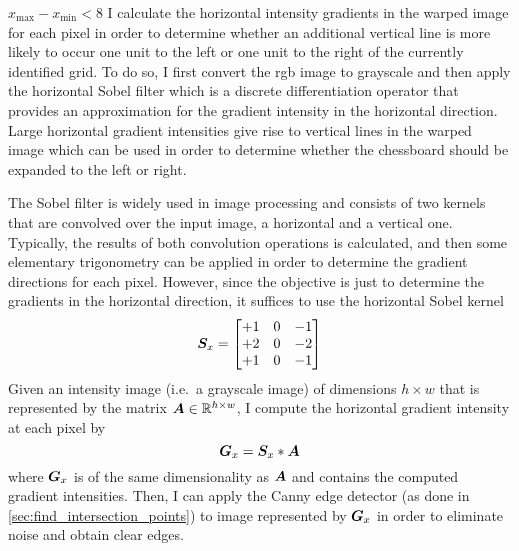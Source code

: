 \documentclass[../report.tex]{subfiles}
\begin{document}
\begin{caselist}
\begin{case}{$x_\text{max}-x_\text{min}<8$}
        I calculate the horizontal intensity gradients in the warped image for each pixel in order to determine whether an additional vertical line is more likely to occur one unit to the left or one unit to the right of the currently identified grid.
        To do so, I first convert the \gls{rgb} image to grayscale and then apply the horizontal Sobel filter which is a discrete differentiation operator that provides an approximation for the gradient intensity in the horizontal direction.
        Large horizontal gradient intensities give rise to vertical lines in the warped image which can be used in order to determine whether the chessboard should be expanded to the left or right.

        The Sobel filter is widely used in image processing and consists of two kernels that are convolved over the input image, a horizontal and a vertical one.
        Typically, the results of both convolution operations is calculated, and then some elementary trigonometry can be applied in order to determine the gradient directions for each pixel.
        However, since the objective is just to determine the gradients in the horizontal direction, it suffices to use the horizontal Sobel kernel
        \begin{equation}
            {\bm{S}}_x = \begin{bmatrix}
                \label{eq:sobel_kernel_horizontal}
                +1 & 0 & -1\\
                +2 & 0 & -2\\
                +1 & 0 & -1
            \end{bmatrix}
        \end{equation}
        Given an intensity image (i.e.\ a grayscale image) of dimensions $h \times w$ that is represented by the matrix ${\bm{A}} \in \mathbb{R}^{h\times w}$, 
        I compute the horizontal gradient intensity at each pixel by
        \begin{equation}
            \label{eq:sobel_operation_horizontal}
            {\bm{G}}_x = {\bm{S}}_x * {\bm{A}}
        \end{equation}
        where ${\bm{G}}_x$ is of the same dimensionality as ${\bm{A}}$ and contains the computed gradient intensities.
        Then, I can apply the Canny edge detector (as done in \cref{sec:find_intersection_points}) to image represented by ${\bm{G}}_x$ in order to eliminate noise and obtain clear edges. 
        \begin{figure}
            \centering
            \begin{subfigure}[t]{0.48\textwidth}

\end{subfigure}
\end{figure}
\end{case}
\end{caselist}
\end{document}
